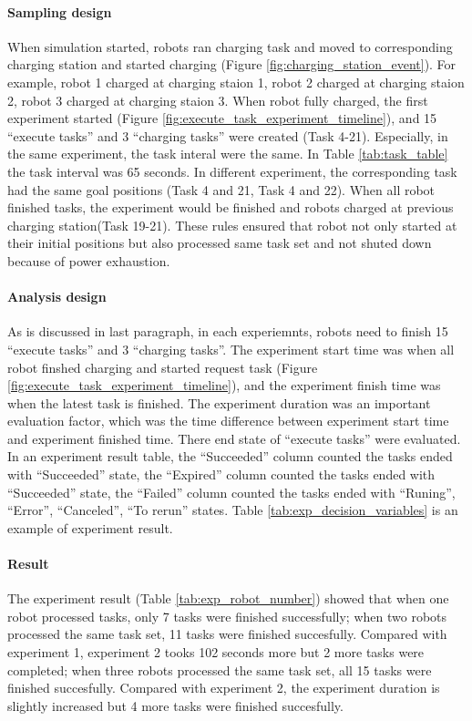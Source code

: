 \paragraph{Sampling design}
When simulation started, robots ran charging task and moved to corresponding charging station and started charging (Figure \ref{fig:charging_station_event}). For example, robot 1 charged at charging staion 1, robot 2 charged at charging staion 2, robot 3 charged at charging staion 3. 
When robot fully charged, the first experiment started (Figure \ref{fig:execute_task_experiment_timeline}), and 15 ``execute tasks'' and 3 ``charging tasks'' were created (Task 4-21). Especially, in the same experiment, the task interal were the same. In Table \ref{tab:task_table} the task interval was 65 seconds. In different experiment, the corresponding task had the same goal positions (Task 4 and 21, Task 4 and 22). 
When all robot finished tasks, the experiment would be finished and robots charged at previous charging station(Task 19-21).
These rules ensured that robot not only started at their initial positions but also processed same task set and not shuted down because of power exhaustion.


\paragraph{Analysis design}
As is discussed in last paragraph, in each experiemnts, robots need to finish 15 ``execute tasks'' and 3 ``charging tasks''.
The experiment start time was when all robot finshed charging and started request task (Figure \ref{fig:execute_task_experiment_timeline}), and the experiment finish time was when the latest task is finished.
The experiment duration was an important evaluation factor, which was the time difference between experiment start time and experiment finished time.  
There end state of ``execute tasks'' were evaluated. In an experiment result table, the ``Succeeded'' column counted the tasks ended with ``Succeeded'' state, the ``Expired'' column counted the tasks ended with ``Succeeded'' state, the ``Failed'' column counted the tasks ended with ``Runing'', ``Error'', ``Canceled'', ``To rerun'' states. 
Table \ref{tab:exp_decision_variables} is an example of experiment result. 

\paragraph{Result} The experiment result (Table \ref{tab:exp_robot_number}) showed that when one robot processed tasks, only 7 tasks were finished successfully; when two robots processed the same task set, 11 tasks were finished succesfully. Compared with experiment 1, experiment 2 tooks 102 seconds more but 2 more tasks were completed; when three robots processed the same task set, all 15 tasks were finished succesfully. Compared with experiment 2, the experiment duration is slightly increased but 4 more tasks were finished succesfully.

